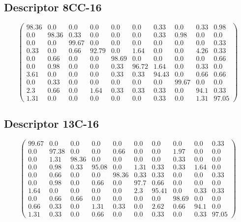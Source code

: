 \begin{appendices}
\subsection{Descriptor 8CC-16}
$$\begin{pmatrix}
98.36&0.0&0.0&0.0&0.0&0.0&0.33&0.0&0.33&0.98\\
0.0&98.36&0.33&0.0&0.0&0.0&0.33&0.98&0.0&0.0\\
0.0&0.0&99.67&0.0&0.0&0.0&0.0&0.0&0.0&0.33\\
0.33&0.0&0.66&92.79&0.0&1.64&0.0&0.0&4.26&0.33\\
0.0&0.66&0.0&0.0&98.69&0.0&0.0&0.0&0.0&0.66\\
0.0&0.98&0.0&0.0&0.33&96.72&1.64&0.0&0.33&0.0\\
3.61&0.0&0.0&0.0&0.33&0.33&94.43&0.0&0.66&0.66\\
0.0&0.33&0.0&0.0&0.0&0.0&0.0&99.67&0.0&0.0\\
2.3&0.66&0.0&1.64&0.33&0.33&0.33&0.0&94.1&0.33\\
1.31&0.0&0.0&0.0&0.0&0.0&0.33&0.0&1.31&97.05
\end{pmatrix}$$

\subsection{Descriptor 13C-16}
$$\begin{pmatrix}
99.67&0.0&0.0&0.0&0.0&0.0&0.0&0.0&0.0&0.33\\
0.0&97.38&0.0&0.0&0.66&0.0&0.0&1.97&0.0&0.0\\
0.0&1.31&98.36&0.0&0.0&0.0&0.0&0.33&0.0&0.0\\
0.0&0.98&0.33&95.08&0.0&1.31&0.33&0.33&1.64&0.0\\
0.0&0.66&0.0&0.0&98.36&0.33&0.33&0.0&0.0&0.33\\
0.0&0.98&0.0&0.66&0.0&97.7&0.66&0.0&0.0&0.0\\
1.64&0.0&0.0&0.0&0.0&2.3&95.41&0.0&0.33&0.33\\
0.0&0.66&0.66&0.0&0.0&0.0&0.0&98.69&0.0&0.0\\
0.66&0.33&0.0&1.31&0.33&0.0&2.62&0.66&94.1&0.0\\
1.31&0.33&0.0&0.66&0.0&0.0&0.33&0.0&0.33&97.05
\end{pmatrix}$$


\end{appendices}

